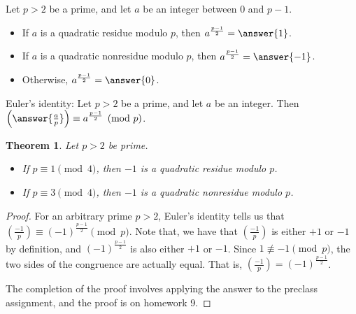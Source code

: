 \documentclass{ximera}
\theoremstyle{plain}
\newtheorem{thm}{Theorem}
\begin{document}
\begin{question}
 Let $p>2$ be a prime, and let $a$ be an integer between $0$ and $p-1$.
 
\begin{itemize}
 \item If $a$ is a quadratic residue modulo $p$, then $a^{\frac{p-1}{2}}=\answer{1}
 $.
 \item If $a$ is a quadratic nonresidue modulo $p$, then $a^{\frac{p-1}{2}}=\answer{-1}
 $.
 \item Otherwise, $a^{\frac{p-1}{2}}=\answer{0}
 $.
\end{itemize}
\end{question}

\begin{question}
 Euler's identity:  Let $p>2$ be a prime, and let $a$ be an integer. Then $\left(\answer{\frac{a}{p}}
 \right)\equiv a^{\frac{p-1}{2}} \pmod p$.
\end{question}

\begin{thm}
 Let $p>2$ be prime.
\begin{itemize}
 \item If $p\equiv 1 \pmod 4$, then $-1$ is a quadratic residue modulo $p$.
 \item If $p\equiv 3 \pmod 4$, then $-1$ is a quadratic nonresidue modulo $p$.
\end{itemize}
\end{thm}
\begin{proof}
 For an arbitrary prime $p>2$, Euler's identity tells us that $\left(\frac{-1}{p}\right)\equiv (-1)^{\frac{p-1}{2}} \pmod p$. Note that, we have that $\left(\frac{-1}{p}\right)$ is either $+1$ or $-1$ by definition, and $(-1)^{\frac{p-1}{2}}$ is also either $+1$ or $-1$. Since $1\not\equiv -1 \pmod p$, the two sides of the congruence are actually equal. That is, $\left(\frac{-1}{p}\right)= (-1)^{\frac{p-1}{2}} $.
 
 The completion of the proof involves applying the answer to the preclass assignment, and the proof is on homework 9.
 \end{proof}
 
\end{document}
